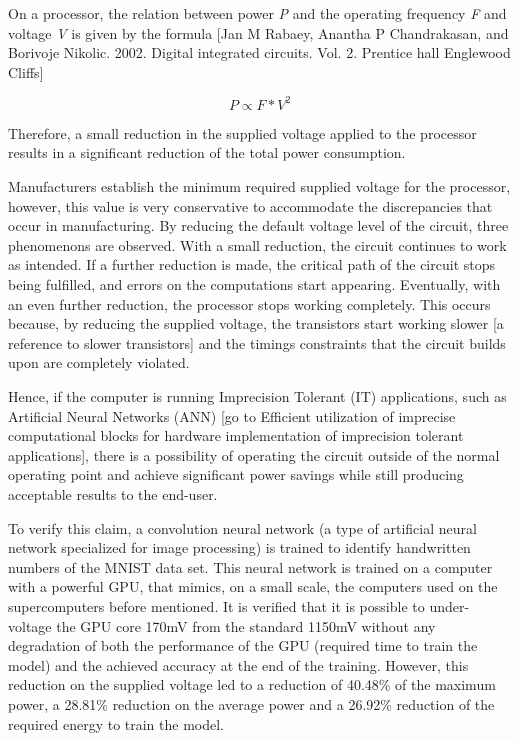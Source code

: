 On a processor, the relation between power \textit{P} and the operating frequency \textit{F} and voltage \textit{V} is given by the formula [Jan M Rabaey, Anantha P Chandrakasan, and Borivoje Nikolic. 2002. Digital integrated circuits. Vol. 2. Prentice hall Englewood Cliﬀs]

\begin{equation}
    P \propto F * V^2
\end{equation}

Therefore, a small reduction in the supplied voltage applied to the processor results in a significant reduction of the total power consumption. 

Manufacturers establish the minimum required supplied voltage for the processor, however, this value is very conservative to accommodate the discrepancies that occur in manufacturing. By reducing the default voltage level of the circuit, three phenomenons are observed. With a small reduction, the circuit continues to work as intended. If a further reduction is made, the critical path of the circuit stops being fulfilled, and errors on the computations start appearing. Eventually, with an even further reduction, the processor stops working completely. This occurs because, by reducing the supplied voltage, the transistors start working slower [a reference to slower transistors] and the timings constraints that the circuit builds upon are completely violated.

Hence, if the computer is running Imprecision Tolerant (IT) applications, such as Artificial Neural Networks (ANN) [go to Efficient utilization of imprecise computational blocks for hardware implementation of imprecision tolerant applications], there is a possibility of operating the circuit outside of the normal operating point and achieve significant power savings while still producing acceptable results to the end-user.

To verify this claim, a convolution neural network (a type of artificial neural network specialized for image processing) is trained to identify handwritten numbers of the MNIST data set. This neural network is trained on a computer with a powerful GPU, that mimics, on a small scale, the computers used on the supercomputers before mentioned. It is verified that it is possible to under-voltage the GPU core 170mV from the standard 1150mV without any degradation of both the performance of the GPU (required time to train the model) and the achieved accuracy at the end of the training. However, this reduction on the supplied voltage led to a reduction of 40.48\% of the maximum power, a  28.81\% reduction on the average power and a 26.92\% reduction of the required energy to train the model.

